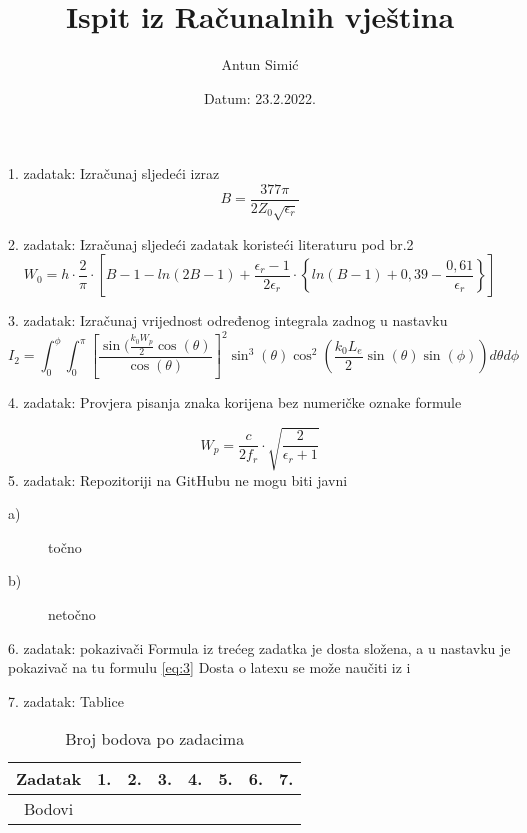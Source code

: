 \documentclass[]{report}
\title{Ispit iz Računalnih vještina}
\author{Antun Simić}
\date{Datum: 23.2.2022.}
\begin{document}
\maketitle

\newpage

1. zadatak: Izračunaj sljedeći izraz
\newline
\begin{equation}
	B=\frac{377\pi}{2Z_0\sqrt{\epsilon_r}} 
\end{equation}

2. zadatak: Izračunaj sljedeći zadatak koristeći literaturu pod br.2
\begin{equation}
	W_0=h \cdot \frac{2}{\pi} \cdot \left[B - 1 - ln(2B - 1) + \frac{\epsilon_r - 1}{2\epsilon_r} \cdot \left\lbrace ln(B-1) + 0,39 - \frac{0,61}{\epsilon_r} \right\rbrace \right] 
\end{equation}

3. zadatak: Izračunaj vrijednost određenog integrala zadnog u nastavku 
\newline
\begin{equation}
	I_2 = \int_{0}^{\phi}\int_{0}^{\pi} \left[ \frac{\sin(\frac{k_0 W_p}{2} \cos(\theta)}{\cos(\theta)}\right] ^2 \sin^3(\theta)  
\cos ^2 \left(  \frac{k_0 L_e}{2} \sin(\theta) \sin(\phi) \right) d\theta d\phi \label{eq:3} 
\end{equation}  
\newline

4. zadatak: Provjera pisanja znaka korijena bez numeričke oznake formule 

$$
	W_p = \frac{c}{2f_r} \cdot \sqrt{\frac{2}{\epsilon_r + 1}}
$$
5. zadatak: Repozitoriji na GitHubu ne mogu biti javni
\begin{description}
	\item[a)] točno
	\item[b)] netočno
\end{description} 

6. zadatak: pokazivači 
\newline
Formula iz trećeg zadatka je dosta složena, a u nastavku je pokazivač na tu formulu \ref{eq:3}
\newline
Dosta o latexu se može naučiti iz \cite{antun} i \cite{latex:web}


7. zadatak: Tablice 
\begin{table}[!htbp]
	\caption{Broj bodova po zadacima}
	\centering
	\begin{tabular}{|c|c|c|c|c|c|c|c|}
		\hline
		Zadatak & 1. & 2. & 3. & 4. & 5. & 6.& 7.\\ [0.5ex]
		\hline 
		Bodovi &  &  &  & & & &\\ [0.5ex]
		\hline
	\end{tabular}
	\label{tab:ID_tabele}
\end{table}

\newpage


\end{document}
